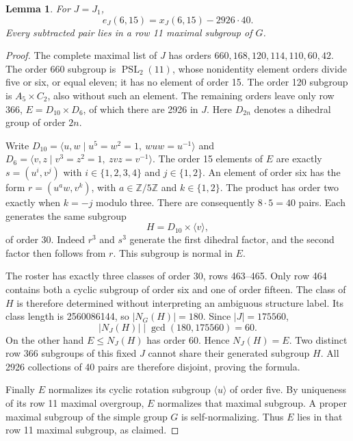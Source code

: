 \documentclass[11pt,a4paper]{article}
\newtheorem{lemma}{Lemma}\newtheorem{theorem}{Theorem}
\begin{document}
\begin{lemma}\label{janko}
For $J=J_1$,
\[
e_J(6,15)=x_J(6,15)-2926\cdot40.
\]
Every subtracted pair lies in a row 11 maximal subgroup of $G$.
\end{lemma}
\begin{proof}
The complete maximal list of $J$ has orders
$660,168,120,114,110,60,42$. The order 660 subgroup is
$\operatorname{PSL}_2(11)$, whose nonidentity element orders
divide five or six, or equal eleven; it has no element of
order 15. The order 120 subgroup is $A_5\times C_2$, also
without such an element. The remaining orders leave only
row 366, $E=D_{10}\times D_6$, of which there are 2926 in $J$.
Here $D_{2n}$ denotes a dihedral group of order $2n$.

Write $D_{10}=\langle u,w\mid u^5=w^2=1,\ wuw=u^{-1}\rangle$
and $D_6=\langle v,z\mid v^3=z^2=1,\ zvz=v^{-1}\rangle$.
The order 15 elements of $E$ are exactly
$s=(u^i,v^j)$ with $i\in\{1,2,3,4\}$ and $j\in\{1,2\}$.
An element of order six has the form $r=(u^aw,v^k)$, with
$a\in\mathbb Z/5\mathbb Z$ and $k\in\{1,2\}$.
The product has order two exactly when $k=-j$ modulo three.
There are consequently $8\cdot5=40$ pairs.
Each generates the same subgroup
\[
H=D_{10}\times\langle v\rangle,
\]
of order 30. Indeed $r^3$ and $s^3$ generate the first dihedral
factor, and the second factor then follows from $r$.
This subgroup is normal in $E$.

The roster has exactly three classes of order 30, rows 463--465.
Only row 464 contains both a cyclic subgroup of order six and
one of order fifteen. The class of $H$ is therefore determined
without interpreting an ambiguous structure label. Its class
length is 2560086144, so $|N_G(H)|=180$. Since $|J|=175560$,
\[
|N_J(H)|\mid\gcd(180,175560)=60.
\]
On the other hand $E\leq N_J(H)$ has order 60. Hence
$N_J(H)=E$. Two distinct row 366 subgroups of this fixed $J$
cannot share their generated subgroup $H$. All 2926 collections
of 40 pairs are therefore disjoint, proving the formula.

Finally $E$ normalizes its cyclic rotation subgroup $\langle u\rangle$
of order five. By uniqueness of its row 11 maximal overgroup,
$E$ normalizes that maximal subgroup. A proper maximal subgroup
of the simple group $G$ is self-normalizing. Thus $E$ lies in
that row 11 maximal subgroup, as claimed.
\end{proof}
\end{document}
